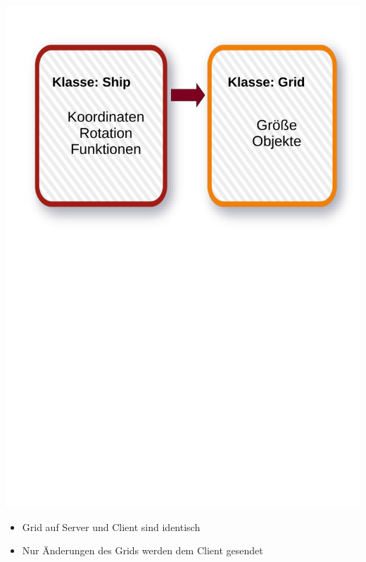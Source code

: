 \begin{frame}
	\begin{center}
		\includegraphics[scale=0.5]{simulation/Simulation5.pdf}
	\end{center}
\end{frame}

\begin{frame}
	\begin{itemize}
		\item Grid auf Server und Client sind identisch
		\item Nur Änderungen des Grids werden dem Client gesendet
	\end{itemize}
\end{frame}